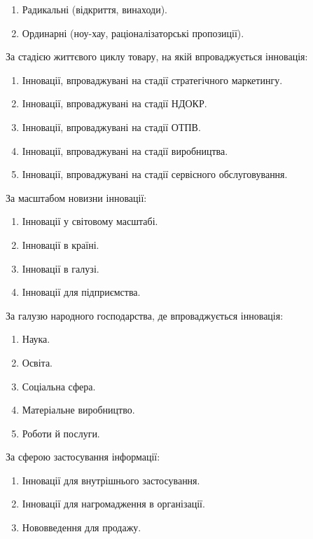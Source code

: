 \begin{enumerate}
	\item Радикальні (відкриття, винаходи).
	\item Ординарні (ноу-хау, раціоналізаторські пропозиції).
\end{enumerate}

За стадією життєвого циклу товару, на якій впроваджується інновація:

\begin{enumerate}
	\item Інновації, впроваджувані на стадії стратегічного маркетингу.
	\item Інновації, впроваджувані на стадії НДОКР.
	\item Інновації, впроваджувані на стадії ОТПВ.
	\item Інновації, впроваджувані на стадії виробництва.
	\item Інновації, впроваджувані на стадії сервісного обслуговування.
\end{enumerate}

За масштабом новизни інновації:

\begin{enumerate}
	\item Інновації у світовому масштабі.
	\item Інновації в країні.
	\item Інновації в галузі.
	\item Інновації для підприємства.
\end{enumerate}

За галузю народного господарства, де впроваджується інновація:

\begin{enumerate}
	\item Наука.
	\item Освіта.
	\item Соціальна сфера.
	\item Матеріальне виробництво.
	\item Роботи й послуги.
\end{enumerate}

За сферою застосування інформації:

\begin{enumerate}
	\item Інновації для внутрішнього застосування.
	\item Інновації для нагромадження в організації.
	\item Нововведення для продажу.
\end{enumerate}

